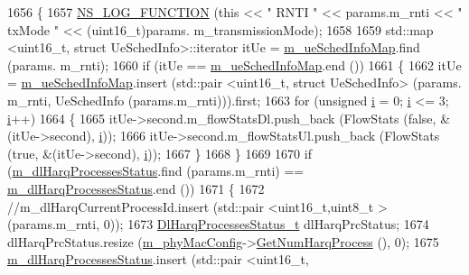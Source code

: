 \begin{DoxyCode}
1656 \{
1657   \hyperlink{log-macros-disabled_8h_a90b90d5bad1f39cb1b64923ea94c0761}{NS\_LOG\_FUNCTION} (\textcolor{keyword}{this} << \textcolor{stringliteral}{" RNTI "} << params.m\_rnti << \textcolor{stringliteral}{" txMode "} << (uint16\_t)params.
      m\_transmissionMode);
1658 
1659   std::map <uint16\_t, struct UeSchedInfo>::iterator itUe = \hyperlink{classns3_1_1MmWaveFlexTtiMaxRateMacScheduler_ac8359b3799f29f5b49e0f2dd52acd0ab}{m\_ueSchedInfoMap}.find (params.
      m\_rnti);
1660   \textcolor{keywordflow}{if} (itUe == \hyperlink{classns3_1_1MmWaveFlexTtiMaxRateMacScheduler_ac8359b3799f29f5b49e0f2dd52acd0ab}{m\_ueSchedInfoMap}.end ())
1661   \{
1662         itUe = \hyperlink{classns3_1_1MmWaveFlexTtiMaxRateMacScheduler_ac8359b3799f29f5b49e0f2dd52acd0ab}{m\_ueSchedInfoMap}.insert (std::pair <uint16\_t, struct UeSchedInfo> (params.
      m\_rnti, UeSchedInfo (params.m\_rnti))).first;
1663         \textcolor{keywordflow}{for} (\textcolor{keywordtype}{unsigned} \hyperlink{bernuolliDistribution_8m_a6f6ccfcf58b31cb6412107d9d5281426}{i} = 0; \hyperlink{bernuolliDistribution_8m_a6f6ccfcf58b31cb6412107d9d5281426}{i} <= 3; \hyperlink{bernuolliDistribution_8m_a6f6ccfcf58b31cb6412107d9d5281426}{i}++)
1664         \{
1665                 itUe->second.m\_flowStatsDl.push\_back (FlowStats (\textcolor{keyword}{false}, &(itUe->second), 
      \hyperlink{bernuolliDistribution_8m_a6f6ccfcf58b31cb6412107d9d5281426}{i}));
1666                 itUe->second.m\_flowStatsUl.push\_back (FlowStats (\textcolor{keyword}{true}, &(itUe->second), 
      \hyperlink{bernuolliDistribution_8m_a6f6ccfcf58b31cb6412107d9d5281426}{i}));
1667         \}
1668   \}
1669 
1670   \textcolor{keywordflow}{if} (\hyperlink{classns3_1_1MmWaveFlexTtiMaxRateMacScheduler_a3f74b4d493895851f7ee62f90584fe0c}{m\_dlHarqProcessesStatus}.find (params.m\_rnti) == 
      \hyperlink{classns3_1_1MmWaveFlexTtiMaxRateMacScheduler_a3f74b4d493895851f7ee62f90584fe0c}{m\_dlHarqProcessesStatus}.end ())
1671   \{
1672         \textcolor{comment}{//m\_dlHarqCurrentProcessId.insert (std::pair <uint16\_t,uint8\_t > (params.m\_rnti, 0));}
1673         \hyperlink{classns3_1_1MmWaveFlexTtiMaxRateMacScheduler_a646125960a440f3d7a27348fd52600ef}{DlHarqProcessesStatus\_t} dlHarqPrcStatus;
1674         dlHarqPrcStatus.resize (\hyperlink{classns3_1_1MmWaveMacScheduler_a24d7af4971d2e500fe543cefbafa2fd9}{m\_phyMacConfig}->\hyperlink{classns3_1_1MmWavePhyMacCommon_a40773d84172ebeb5aff125f56ebcc5ac}{GetNumHarqProcess} (), 0);
1675         \hyperlink{classns3_1_1MmWaveFlexTtiMaxRateMacScheduler_a3f74b4d493895851f7ee62f90584fe0c}{m\_dlHarqProcessesStatus}.insert (std::pair <uint16\_t,

\end{DoxyCode}
